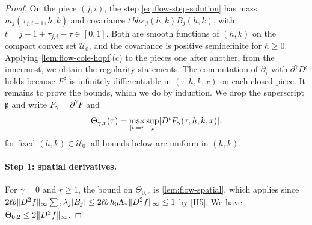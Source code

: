 \begin{proof}
On the piece $(j,i)$, the step \eqref{eq:flow-step-solution} has mass
$m_j(\tau_{j,i-1},h,k)$ and covariance $t\,bh\kappa_j(h,k)B_j(h,k)$, with
$t=j-1+\tau_{j,i}-\tau\in[0,1]$. Both are smooth functions of $(h,k)$ on the
compact convex set $\mathcal U_0$, and the covariance is positive semidefinite
for $h\ge0$. Applying \cref{lem:flow-cole-hopf}(c) to the pieces one after
another, from the innermost, we obtain the regularity statements. The
commutation of $\partial_\tau$ with $\partial^\gamma D^\iota$ holds because
$F^{\mathfrak p}$ is infinitely differentiable in $(\tau,h,k,x)$ on each closed
piece. It remains to prove the bounds, which we do by induction. We drop the
superscript $\mathfrak p$ and write $F_\gamma=\partial^\gamma F$ and
\[
 \Theta_{\gamma,r}(\tau)=\max_{\lvert \iota\rvert=r}\sup_{x}
 \lvert D^\iota F_\gamma(\tau,h,k,x)\rvert,
\]
for fixed $(h,k)\in\mathcal U_0$; all bounds below are uniform in $(h,k)$.

\paragraph{Step 1: spatial derivatives.} For $\gamma=0$ and $r\ge1$, the bound
on $\Theta_{0,r}$ is \cref{lem:flow-spatial}, which applies since
$2\ell b\lVert D^2f\rVert_\infty\sum_j\lambda_j\lvert B_j\rvert\le2\ell b\,h_0\Lambda_*
\lVert D^2f\rVert_\infty\le1$ by \ref{H5}. We have $\Theta_{0,2}\le2\lVert D^2f\rVert_\infty$.


\end{proof}
